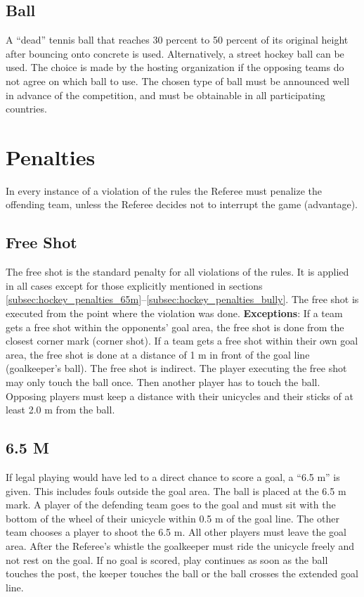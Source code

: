 \subsection{Ball}
A ``dead'' tennis ball that reaches 30 percent to 50 percent of its original height after bouncing onto concrete is used.
Alternatively, a street hockey ball can be used.
The choice is made by the hosting organization if the opposing teams do not agree on which ball to use.
The chosen type of ball must be announced well in advance of the competition, and must be obtainable in all participating countries.

\section{Penalties}
In every instance of a violation of the rules the Referee must penalize the offending team, unless the Referee decides not to interrupt the game (advantage).

\subsection{Free Shot}
The free shot is the standard penalty for all violations of the rules.
It is applied in all cases except for those explicitly mentioned in sections \ref{subsec:hockey_penalties_65m}–\ref{subsec:hockey_penalties_bully}.
The free shot is executed from the point where the violation was done.
\textbf{Exceptions}: If a team gets a free shot within the opponents' goal area, the free shot is done from the closest corner mark (corner shot).
If a team gets a free shot within their own goal area, the free shot is done at a distance of 1 m in front of the goal line (goalkeeper's ball).
The free shot is indirect.
The player executing the free shot may only touch the ball once.
Then another player has to touch the ball.
Opposing players must keep a distance with their unicycles and their sticks of at least 2.0 m from the ball.

\subsection{6.5 M \label{subsec:hockey_penalties_65m}}
If legal playing would have led to a direct chance to score a goal, a ``6.5 m'' is given.
This includes fouls outside the goal area.
The ball is placed at the 6.5 m mark.
A player of the defending team goes to the goal and must sit with the bottom of the wheel of their unicycle within 0.5 m of the goal line.
The other team chooses a player to shoot the 6.5 m.
All other players must leave the goal area.
After the Referee's whistle the goalkeeper must ride the unicycle freely and not rest on the goal.
If no goal is scored, play continues as soon as the ball touches the post, the keeper touches the ball or the ball crosses the extended goal line.

